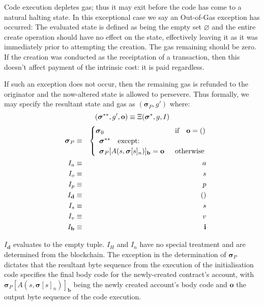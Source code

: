 \documentclass[9pt,oneside]{amsart}
\begin{document}
\begin{multicols}{2}
Code execution depletes gas; thus it may exit before the code has come to a natural halting state. In this exceptional case we say an Out-of-Gas exception has occurred: The evaluated state is defined as being the empty set $\varnothing$ and the entire create operation should have no effect on the state, effectively leaving it as it was immediately prior to attempting the creation. The gas remaining should be zero. If the creation was conducted as the receiptation of a transaction, then this doesn't affect payment of the intrinsic cost: it is paid regardless.

If such an exception does not occur, then the remaining gas is refunded to the originator and the now-altered state is allowed to persevere. Thus formally, we may specify the resultant state and gas as $(\boldsymbol{\sigma}_P, g')$ where:
\begin{equation}
(\boldsymbol{\sigma}^{**}, g', \mathbf{o}) \equiv \Xi(\boldsymbol{\sigma}^*, g, I) \\
\end{equation}
\begin{eqnarray}
\quad \boldsymbol{\sigma}_P & \equiv & \begin{cases}
\boldsymbol{\sigma}_0 & \text{if} \quad \mathbf{o} = () \\
\begin{array}[b]{l}
\boldsymbol{\sigma}^{**} \quad \text{except:} \\
\boldsymbol{\sigma}_P[A(s, \boldsymbol{\sigma}[s]_n)]_{\mathbf{b}} = \mathbf{o}
\end{array} & \text{otherwise}
\end{cases} \\
I_a & \equiv & a \\
I_o & \equiv & s \\
I_p & \equiv & p \\
I_\mathbf{d} & \equiv & () \\
I_s & \equiv & s \\
I_v & \equiv & v \\
I_\mathbf{b} & \equiv & \mathbf{i}
\end{eqnarray}

$I_\mathbf{d}$ evaluates to the empty tuple. $I_H$ and $I_n$ have no special treatment and are determined from the blockchain. The exception in the determination of $\boldsymbol{\sigma}_P$ dictates that the resultant byte sequence from the execution of the initialisation code specifies the final body code for the newly-created contract's account, with $\boldsymbol{\sigma}_P[A(s, \boldsymbol{\sigma}[s]_n)]_{\mathbf{b}}$ being the newly created account's body code and $\mathbf{o}$ the output byte sequence of the code execution.


\end{multicols}
\end{document}
